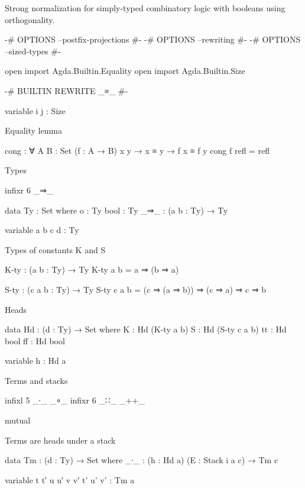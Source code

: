 
Strong normalization for simply-typed combinatory logic with booleans
using orthogonality.


\begin{code}
{-# OPTIONS --postfix-projections #-}
{-# OPTIONS --rewriting #-}
{-# OPTIONS --sized-types #-}

open import Agda.Builtin.Equality
open import Agda.Builtin.Size

{-# BUILTIN REWRITE _≡_ #-}

variable i j : Size
\end{code}

Equality lemma

\begin{code}
cong : ∀ {A B : Set} (f : A → B) {x y} → x ≡ y → f x ≡ f y
cong f refl = refl
\end{code}


Types

\begin{code}
infixr 6 _⇒_

data Ty : Set where
  o     : Ty
  bool  : Ty
  _⇒_   : (a b : Ty) → Ty

variable a b c d : Ty
\end{code}

Types of constants K and S

\begin{code}
K-ty : (a b : Ty) → Ty
K-ty a b = a ⇒ (b ⇒ a)

S-ty : (c a b : Ty) → Ty
S-ty c a b = (c ⇒ (a ⇒ b)) ⇒ (c ⇒ a) ⇒ c ⇒ b
\end{code}

Heads

\begin{code}
data Hd : (d : Ty) → Set where
  K   : Hd (K-ty a b)
  S   : Hd (S-ty c a b)
  tt  : Hd bool
  ff  : Hd bool

variable h : Hd a
\end{code}

Terms and stacks

\begin{code}
infixl 5 _∙_ _∘_
infixr 6 _∷_ _++_

mutual
\end{code}

  Terms are heads under a stack

\begin{code}
  data Tm : (d : Ty) → Set where
    _∙_ : (h : Hd a) (E : Stack i a c) → Tm c

  variable t t′ u u′ v v′ t' u' v' : Tm a
\end{code}

